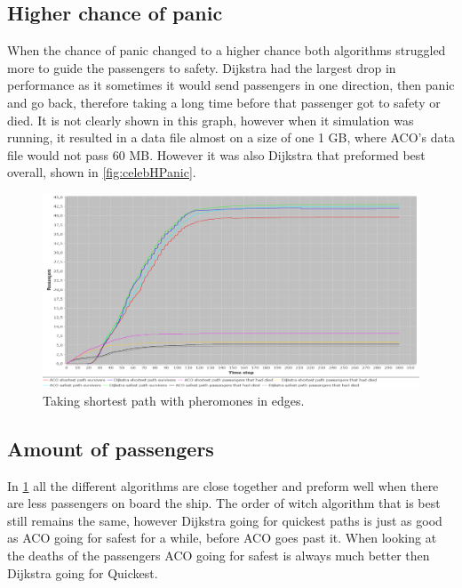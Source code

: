 \subsection{Higher chance of panic}

When the chance of panic changed to a higher chance both algorithms struggled more to guide the passengers to safety. Dijkstra had the largest drop in performance as it sometimes it would send passengers in one direction, then panic and go back, therefore taking a long time before that passenger got to safety or died. It is not clearly shown in this graph, however when it simulation was running, it resulted in a data file almost on a size of one 1 GB, where ACO's data file would not pass 60 MB. However it was also Dijkstra that preformed best overall, shown in \ref{fig:celebHPanic}.

\begin{figure} [h]
\centering
\hspace*{-1.0in}
\includegraphics[scale=0.35]{images/Graph-using-200-rounds-50-passangers.png}
\caption{Taking shortest path with pheromones in edges.}
\label{fig:celeb50}
\end{figure}

\subsection{Amount of passengers}

In \ref{fig:celeb50} all the different algorithms are close together and preform well when there are less passengers on board the ship. The order of witch algorithm that is best still remains the same, however Dijkstra going for quickest paths is just as good as ACO going for safest for a while, before ACO goes past it. When looking at the deaths of the passengers ACO going for safest is always much better then Dijkstra going for Quickest.


